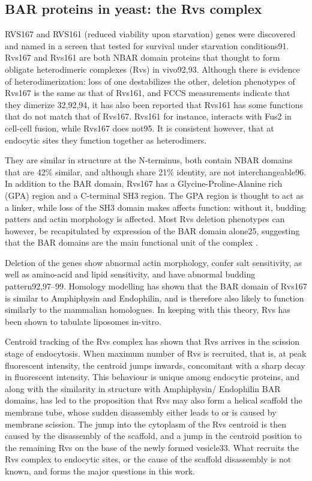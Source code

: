 		\subsection{BAR proteins in yeast: the Rvs complex}		
		RVS167 and RVS161 (reduced viability upon starvation) genes were discovered and named in a screen that tested for survival under starvation conditions91. Rvs167 and Rvs161 are both NBAR domain proteins that thought to form obligate heterodimeric complexes (Rvs) in vivo92,93. Although there is evidence of heterodimerization: loss of one destabilizes the other, deletion phenotypes of Rvs167 is the same as that of Rvs161, and FCCS measurements indicate that they dimerize 32,92,94, it has also been reported that Rvs161 has some functions that do not match that of Rvs167. Rvs161 for instance, interacts with Fus2 in cell-cell fusion, while Rvs167 does not95. It is consistent however, that at endocytic sites they function together as heterodimers. 
		
		\vspace{5mm}
		They are similar in structure at the N-terminus, both contain NBAR domains that are 42\% similar, and although share 21\% identity, are not interchangeable96. In addition to the BAR domain, Rvs167 has a Glycine-Proline-Alanine rich (GPA) region and a C-terminal SH3 region. The GPA region is thought to act as a linker, while loss of the SH3 domain makes affects function: without it, budding patters and actin morphology is affected. Most Rvs deletion phenotypes can however, be recapitulated by expression of the BAR domain alone25, suggesting that the BAR domains are the main functional unit of the complex .
		
		\vspace{5mm}
		Deletion of the genes show abnormal actin morphology, confer salt sensitivity, as well as amino-acid and lipid sensitivity, and have abnormal budding pattern92,97–99. Homology modelling has shown that the BAR domain of Rvs167 is similar to Amphiphysin and Endophilin, and is therefore also likely to function similarly to the mammalian homologues. In keeping with this theory, Rvs has been shown to tabulate liposomes in-vitro. 
		
		\vspace{5mm}
		Centroid tracking of the Rvs complex has shown that Rvs arrives in the scission stage of endocytosis. When maximum number of Rvs is recruited, that is, at peak fluorescent intensity, the centroid jumps inwards, concomitant with a sharp decay in fluorescent intensity. This behaviour is unique among endocytic proteins, and along with the similarity in structure with Amphiphysin/ Endophilin BAR domains, has led to the proposition that Rvs may also form a helical scaffold the membrane tube, whose sudden disassembly either leads to or is caused by membrane scission. The jump into the cytoplasm of the Rvs centroid is then caused by the disassembly of the scaffold, and a jump in the centroid position to the remaining Rvs on the base of the newly formed vesicle33. What recruits the Rvs complex to endocytic sites, or the cause of the scaffold disassembly is not known, and forms the major questions in this work.

		

